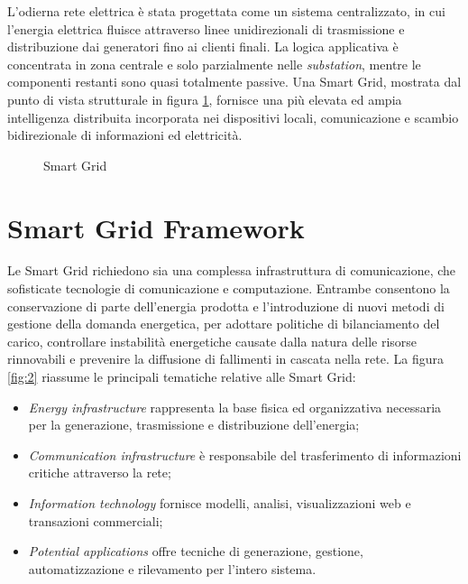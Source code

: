 L'odierna rete elettrica è stata progettata come un sistema centralizzato, in cui l'energia elettrica fluisce attraverso linee unidirezionali di trasmissione e distribuzione dai generatori fino ai clienti finali. La logica applicativa è concentrata in zona centrale e solo parzialmente nelle \emph{substation}, mentre le componenti restanti sono quasi totalmente passive. Una Smart Grid, mostrata dal punto di vista strutturale in figura \ref{fig:1}, fornisce una più elevata ed ampia intelligenza distribuita incorporata nei dispositivi locali, comunicazione e scambio bidirezionale di informazioni ed elettricità.

\begin{figure}[h] 
\caption{Smart Grid}\label{fig:1}
\end{figure}

\section{Smart Grid Framework}
Le Smart Grid richiedono sia una complessa infrastruttura di comunicazione, che sofisticate tecnologie di comunicazione e computazione. Entrambe consentono la conservazione di parte dell'energia prodotta e l'introduzione di nuovi metodi di gestione della domanda energetica, per adottare politiche di bilanciamento del carico, controllare instabilità energetiche causate dalla natura delle risorse rinnovabili e prevenire la diffusione di fallimenti in cascata nella rete. 
\newline 
La figura \ref{fig:2} riassume le principali tematiche relative alle Smart Grid:
\begin{itemize}
	\item \emph{Energy infrastructure} rappresenta la base fisica ed organizzativa necessaria per la generazione, trasmissione e distribuzione dell'energia;
	\item \emph{Communication infrastructure} è responsabile del trasferimento di informazioni critiche attraverso la rete;
	\item \emph{Information technology} fornisce modelli, analisi, visualizzazioni web e transazioni commerciali;
	\item \emph{Potential applications} offre tecniche di generazione, gestione, automatizzazione e rilevamento per l'intero sistema.
\end{itemize} 

